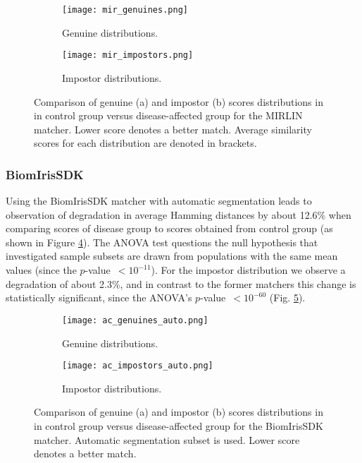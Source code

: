 \documentclass[a4paper]{spie}
\begin{document}
\begin{figure}[!h]
\centering
\begin{subfigure}{0.5\textwidth}
  \centering
  \texttt{[image: mir\_genuines.png]}
  \caption{Genuine distributions.}
  \label{mir_genuines}
\end{subfigure}%
\begin{subfigure}{0.5\textwidth}
  \centering
  \texttt{[image: mir\_impostors.png]}
  \caption{Impostor distributions.}
  \label{mir_impostors}
\end{subfigure}
\vskip0.2cm
\caption{Comparison of genuine (a) and impostor (b) scores distributions in in control group versus disease-affected group for the MIRLIN matcher. Lower score denotes a better match. Average similarity scores for each distribution are denoted in brackets.}
\end{figure}

\subsubsection{BiomIrisSDK}
Using the BiomIrisSDK matcher with automatic segmentation leads to observation of degradation in average Hamming distances by about 12.6\% when comparing scores of disease group to scores obtained from control group (as shown in Figure \ref{ac_genuines_auto}). The ANOVA test questions the null hypothesis that investigated sample subsets are drawn from populations with the same mean values (since the $p$-value~$<10^{-11}$). For the impostor distribution we observe a degradation of about 2.3\%, and in contrast to the former matchers this change is statistically significant, since the ANOVA's $p$-value~$<10^{-60}$ (Fig. \ref{ac_impostors_auto}).

\begin{figure}[!h]
\centering
\begin{subfigure}{0.5\textwidth}
  \centering
  \texttt{[image: ac\_genuines\_auto.png]}
  \caption{Genuine distributions.}
  \label{ac_genuines_auto}
\end{subfigure}%
\begin{subfigure}{0.5\textwidth}
  \centering
  \texttt{[image: ac\_impostors\_auto.png]}
  \caption{Impostor distributions.}
  \label{ac_impostors_auto}
\end{subfigure}
\vskip0.2cm
\caption{Comparison of genuine (a) and impostor (b) scores distributions in in control group versus disease-affected group for the BiomIrisSDK matcher. Automatic segmentation subset is used. Lower score denotes a better match.}
\label{ac_auto}
\end{figure}
\end{document}
